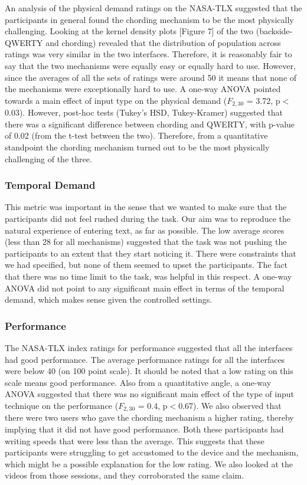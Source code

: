 An analysis of the physical demand ratings on the NASA-TLX suggested that the participants in general found the chording mechanism to be the most physically challenging. Looking at the kernel density plots [Figure 7] of the two (backside-QWERTY and chording) revealed that the distribution of population across ratings was very similar in the two interfaces. Therefore, it is reasonably fair to say that the two mechanisms were equally easy or equally hard to use. However, since the averages of all the sets of ratings were around 50 it means that none of the mechanisms were exceptionally hard to use. A one-way ANOVA pointed towards a main effect of input type on the physical demand ($F_{2,30}$ = 3.72, p$<$0.03). However, post-hoc tests (Tukey's HSD, Tukey-Kramer) suggested that there was a significant difference between chording and QWERTY, with p-value of 0.02 (from the t-test between the two). Therefore, from a quantitative standpoint the chording mechanism turned out to be the most physically challenging of the three.

\subsubsection{Temporal Demand}

This metric was important in the sense that we wanted to make sure that the participants did not feel rushed during the task. Our aim was to reproduce the natural experience of entering text, as far as possible. The low average scores (less than 28 for all mechanisms) suggested that the task was not pushing the participants to an extent that they start noticing it. There were constraints that we had specified, but none of them seemed to upset the participants. The fact that there was no time limit to the task, was helpful in this respect. A one-way ANOVA did not point to any significant main effect in terms of the temporal demand, which makes sense given the controlled settings.

\subsubsection{Performance}

The NASA-TLX index ratings for performance suggested that all the interfaces had good performance. The average performance ratings for all the interfaces were below 40 (on 100 point scale). It should be noted that a low rating on this scale means good performance. Also from a quantitative angle, a one-way ANOVA suggested that there was no significant main effect of the type of input technique on the performance ($F_{2,30}$ = 0.4, p$<$0.67). We also observed that there were two users who gave the chording mechanism a higher rating, thereby implying that it did not have good performance. Both these participants had writing speeds that were less than the average. This suggests that these participants were struggling to get accustomed to the device and the mechanism, which might be a possible explanation for the low rating. We also looked at the videos from those sessions, and they corroborated the same claim. 

